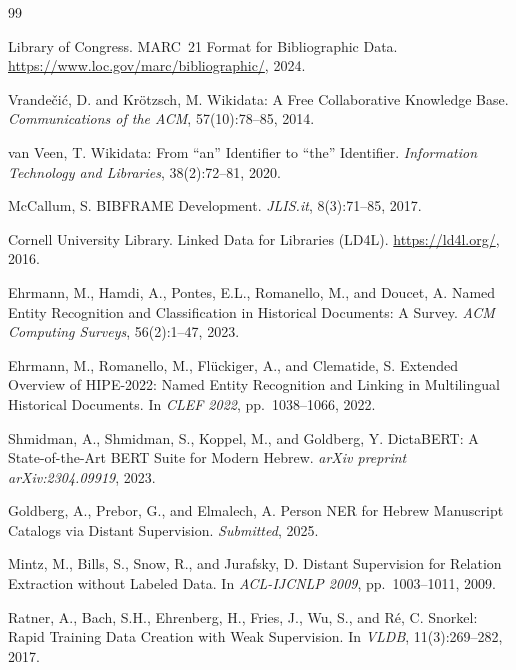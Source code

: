 \documentclass[Afour,sageh,times]{sagej}
\begin{document}
\begin{thebibliography}{99}

Library of Congress.
\newblock MARC~21 Format for Bibliographic Data.
\newblock \url{https://www.loc.gov/marc/bibliographic/}, 2024.

Vrande\v{c}i\'{c}, D. and Kr\"{o}tzsch, M.
\newblock Wikidata: A Free Collaborative Knowledge Base.
\newblock \emph{Communications of the ACM}, 57(10):78--85, 2014.

van Veen, T.
\newblock Wikidata: From ``an'' Identifier to ``the'' Identifier.
\newblock \emph{Information Technology and Libraries}, 38(2):72--81, 2020.

McCallum, S.
\newblock BIBFRAME Development.
\newblock \emph{JLIS.it}, 8(3):71--85, 2017.

Cornell University Library.
\newblock Linked Data for Libraries (LD4L).
\newblock \url{https://ld4l.org/}, 2016.

Ehrmann, M., Hamdi, A., Pontes, E.L., Romanello, M., and Doucet, A.
\newblock Named Entity Recognition and Classification in Historical Documents: A Survey.
\newblock \emph{ACM Computing Surveys}, 56(2):1--47, 2023.

Ehrmann, M., Romanello, M., Fl\"{u}ckiger, A., and Clematide, S.
\newblock Extended Overview of HIPE-2022: Named Entity Recognition and Linking in Multilingual Historical Documents.
\newblock In \emph{CLEF 2022}, pp.~1038--1066, 2022.

Shmidman, A., Shmidman, S., Koppel, M., and Goldberg, Y.
\newblock DictaBERT: A State-of-the-Art BERT Suite for Modern Hebrew.
\newblock \emph{arXiv preprint arXiv:2304.09919}, 2023.

Goldberg, A., Prebor, G., and Elmalech, A.
\newblock Person NER for Hebrew Manuscript Catalogs via Distant Supervision.
\newblock \emph{Submitted}, 2025.

Mintz, M., Bills, S., Snow, R., and Jurafsky, D.
\newblock Distant Supervision for Relation Extraction without Labeled Data.
\newblock In \emph{ACL-IJCNLP 2009}, pp.~1003--1011, 2009.

Ratner, A., Bach, S.H., Ehrenberg, H., Fries, J., Wu, S., and R\'{e}, C.
\newblock Snorkel: Rapid Training Data Creation with Weak Supervision.
\newblock In \emph{VLDB}, 11(3):269--282, 2017.


\end{thebibliography}
\end{document}
